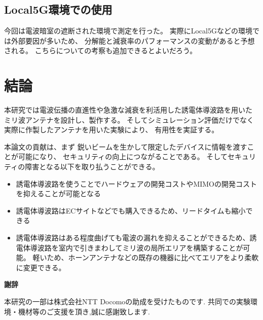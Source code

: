 \documentclass[technicalreport]{ieicej}
\begin{document}
\subsection{Local5G環境での使用}

今回は電波暗室の遮断された環境で測定を行った。
実際にLocal5Gなどの環境では外部要因が多いため、
分解能と減衰率のパフォーマンスの変動があると予想される。
こちらについての考察も追加できるとよいだろう。

\section{結論}

本研究では電波伝播の直進性や急激な減衰を利活用した誘電体導波路を用いた
ミリ波アンテナを設計し、製作する。
そしてシミュレーション評価だけでなく実際に作製したアンテナを用いた実験により、
有用性を実証する。

本論文の貢献は、まず
鋭いビームを生かして限定したデバイスに情報を渡すことが可能になり、
セキュリティの向上につながることである。
そしてセキュリティの障害となる以下を取り払うことができる。

\begin{itemize}
  \item 誘電体導波路を使うことでハードウェアの開発コストやMIMOの開発コストを抑えることが可能となる
  \item 誘電体導波路はECサイトなどでも購入できるため、リードタイムも縮小できる
  \item 誘電体導波路はある程度曲げても電波の漏れを抑えることができるため、誘電体導波路を室内で引きまわしてミリ波の局所エリアを構築することが可能。
  軽いため、ホーンアンテナなどの既存の機器に比べてエリアをより柔軟に変更できる。
\end{itemize}

\begin{center}
  \Large \textbf{謝辞}
\end{center}

本研究の一部は株式会社NTT Docomoの助成を受けたものです.
共同での実験環境・機材等のご支援を頂き,誠に感謝致します.

%
%

\end{document}
